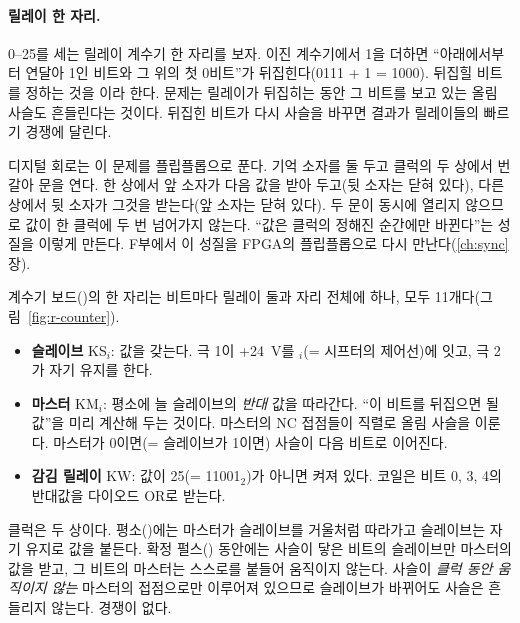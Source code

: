 \paragraph{릴레이 한 자리.} 0--25를 세는 릴레이 계수기 한 자리를 보자. 이진 계수기에서 1을 더하면 ``아래에서부터
연달아 1인 비트와 그 위의 첫 0비트''가 뒤집힌다(0111 + 1 = 1000). 뒤집힐 비트를 정하는 것을 이라 한다. 문제는 릴레이가 뒤집히는 동안 그 비트를 보고 있는 올림 사슬도 흔들린다는 것이다. 뒤집힌 비트가
다시 사슬을 바꾸면 결과가 릴레이들의 빠르기 경쟁에 달린다.

\General 디지털 회로는 이 문제를  플립플롭으로 푼다. 기억 소자를 둘 두고
클럭의 두 상에서 번갈아 문을 연다. 한 상에서 앞 소자가 다음 값을 받아 두고(뒷 소자는 닫혀 있다), 다른
상에서 뒷 소자가 그것을 받는다(앞 소자는 닫혀 있다). 두 문이 동시에 열리지 않으므로 값이 한 클럭에 두 번
넘어가지 않는다. ``값은 클럭의 정해진 순간에만 바뀐다''는 성질을 이렇게 만든다. F부에서 이 성질을 FPGA의
플립플롭으로 다시 만난다(\ref{ch:sync}장).

\Ours 계수기 보드()의 한 자리는 비트마다 릴레이 둘과 자리 전체에 하나, 모두
11개다(그림~\ref{fig:r-counter}).
\begin{itemize}
\item \textbf{슬레이브} KS$_i$: 값을 갖는다. 극 1이 +24~V를 $_i$(= 시프터의 제어선)에 잇고, 극 2가 자기
유지를 한다.
\item \textbf{마스터} KM$_i$: 평소에 늘 슬레이브의 \emph{반대} 값을 따라간다. ``이 비트를 뒤집으면 될 값''을
미리 계산해 두는 것이다. 마스터의 NC 접점들이 직렬로 올림 사슬을 이룬다. 마스터가 0이면(= 슬레이브가 1이면)
사슬이 다음 비트로 이어진다.
\item \textbf{감김 릴레이} KW: 값이 25(= 11001$_2$)가 아니면 켜져 있다. 코일은 비트 0, 3, 4의 반대값을 다이오드
OR로 받는다.
\end{itemize}
클럭은 두 상이다. 평소()에는 마스터가 슬레이브를 거울처럼 따라가고 슬레이브는 자기 유지로 값을
붙든다. 확정 펄스() 동안에는 사슬이 닿은 비트의 슬레이브만 마스터의 값을 받고, 그 비트의 마스터는
스스로를 붙들어 움직이지 않는다. 사슬이 \emph{클럭 동안 움직이지 않는} 마스터의 접점으로만 이루어져 있으므로
슬레이브가 바뀌어도 사슬은 흔들리지 않는다. 경쟁이 없다.

